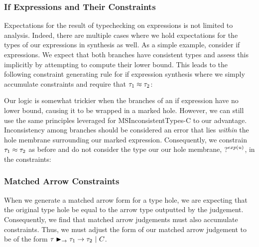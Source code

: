 \subsubsection{If Expressions and Their Constraints}
Expectations for the result of typechecking on expressions is not limited to analysis. Indeed, there are multiple cases where we hold expectations for the types of our expressions in synthesis as well. As a simple example, consider if expressions. We expect that both branches have consistent types and assess this implicitly by attempting to compute their lower bound. This leads to the following constraint generating rule for if expression synthesis where we simply accumulate constraints and require that $\TMV_1 \approx \TMV_2$:

\begin{mathpar}
\end{mathpar} 

Our logic is somewhat trickier when the branches of an if expression have no lower bound, causing it to be wrapped in a marked hole. However, we can still use the same principles leveraged for MSInconsistentTypes-C to our advantage. Inconsistency among branches should be considered an error that lies \emph{within} the hole membrane surrounding our marked expression. Consequently, we constrain $\TMV_1 \approx \TMV_2$ as before and do not consider the type our our hole membrane, $\TUnknown^{exp(u)}$, in the constraints:

\begin{mathpar}
\end{mathpar}

\subsubsection{Matched Arrow Constraints}
When we generate a matched arrow form for a type hole, we are expecting that the original type hole be equal to the arrow type outputted by the judgement. Consequently, we find that matched arrow judgements must also accumulate constraints. Thus, we must adjust the form of our matched arrow judgement to be of the form $\matchedArrow{\TMV}{\TMV_1}{\TMV_2} ~|~ C$.

